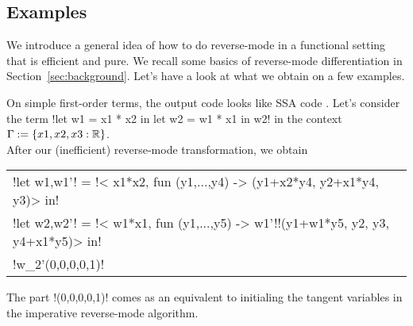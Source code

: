 \subsection{Examples}

We introduce a general idea of how to do reverse-mode in a functional setting that is efficient and pure.
We recall some basics of reverse-mode differentiation in Section~\ref{sec:background}.
Let's have a look at what we obtain on a few examples.

\begin{example}
On simple first-order terms, the output code looks like SSA code \cite{}.
Let's consider  the term !let w1 = x1 * x2 in let w2 = w1 * x1 in w2! in the context $\Gamma:=\{x1,x2,x3:\mathbb{R}\}$.\\
After our (inefficient) reverse-mode transformation, we obtain
\begin{center}
    \begin{tabular}{l}
        !let w1,w1'! = !< x1*x2, fun (y1,...,y4) -> (y1+x2*y4, y2+x1*y4, y3)> in!\\
        !let w2,w2'! = !< w1*x1, fun (y1,...,y5) -> w1'!!(y1+w1*y5, y2, y3, y4+x1*y5)> in!\\
        !w_2'(0,0,0,0,1)!
    \end{tabular}
\end{center}
The part !(0,0,0,0,1)! comes as an equivalent to initialing the tangent variables in the imperative reverse-mode algorithm. 


\end{example}

